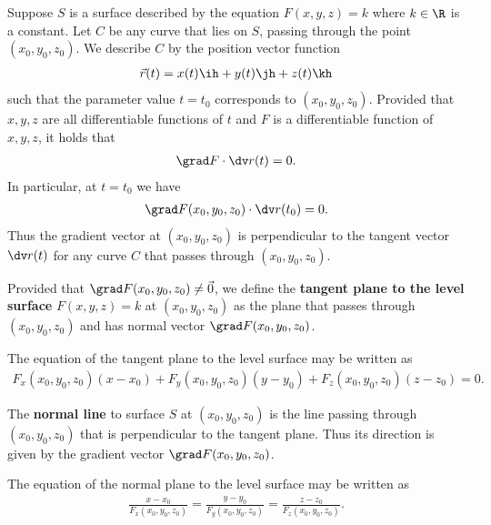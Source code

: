 \documentclass{article}
\begin{document}
\begin{theorem}
	Suppose $S$ is a surface described by the equation $F(x,y,z)=k$ where
	$k\in\R$ is a constant. Let $C$ be any curve that lies on $S$, passing
	through the point $(x_0,y_0,z_0)$. We describe $C$ by the position vector
	function
	\begin{align*}
		\vec r(t) = x(t)\ih + y(t)\jh + z(t)\kh
	\end{align*}
	such that the parameter value $t=t_0$ corresponds to $(x_0, y_0, z_0)$.
	Provided that $x,y,z$ are all differentiable functions of $t$ and $F$
	is a differentiable function of $x,y,z$, it holds that
	\begin{align*}
		\grad F \cdot \dv r(t) = 0.
	\end{align*}
	In particular, at $t=t_0$ we have
	\begin{align*}
		\grad F(x_0, y_0, z_0)\cdot \dv r(t_0) = 0.
	\end{align*}
	Thus the gradient vector at $(x_0, y_0, z_0)$ is perpendicular to the
	tangent vector $\dv r(t)$ for any curve $C$ that passes through
	$(x_0, y_0, z_0)$.
\end{theorem}
\begin{definition}
	Provided that $\grad F(x_0, y_0, z_0)\not=\vec 0$, we define the
	\textbf{tangent plane to the level surface} $F(x,y,z)=k$ at $(x_0, y_0, z_0)$
	as the plane that passes through $(x_0, y_0, z_0)$ and has normal vector
	$\grad F(x_0, y_0, z_0)$.
\end{definition}
\begin{theorem}
	The equation of the tangent plane to the level surface may be written as
	\begin{align*}
		F_x(x_0, y_0, z_0)(x-x_0)+F_y(x_0, y_0, z_0)(y-y_0)+F_z(x_0, y_0, z_0)(z-z_0)=0.
	\end{align*}
\end{theorem}
\begin{definition}
	The \textbf{normal line} to surface $S$ at $(x_0, y_0, z_0)$ is the line
	passing through $(x_0, y_0, z_0)$ that is perpendicular to the tangent
	plane. Thus its direction is given by the gradient vector
	$\grad F(x_0, y_0, z_0)$.
\end{definition}
\begin{theorem}
	The equation of the normal plane to the level surface may be written as
	\begin{align*}
		\frac{x-x_0}{F_x(x_0, y_0, z_0)}
		=\frac{y-y_0}{F_y(x_0, y_0, z_0)}
		=\frac{z-z_0}{F_z(x_0, y_0, z_0)}.
	\end{align*}
\end{theorem}
\end{document}
